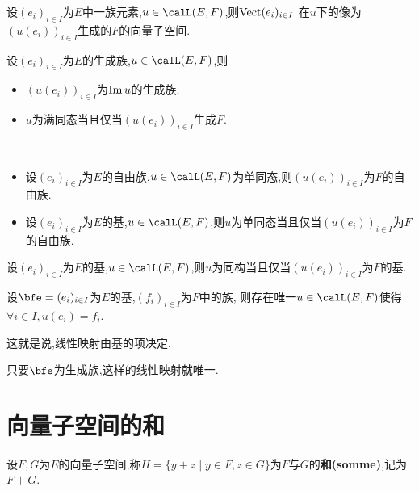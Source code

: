 \begin{prop}
    设$(e_i)_{i \in I}$为$E$中一族元素,$u \in \calL(E, F)$,则$\operatorname{Vect}(e_i)_{i \in I}$
    在$u$下的像为$(u(e_i))_{i \in I}$生成的$F$的向量子空间.
\end{prop}

\begin{cor}
    设$(e_i)_{i \in I}$为$E$的生成族,$u \in \calL(E, F)$,则
    \begin{itemize}
        \item $(u(e_i))_{i \in I}$为$\operatorname{Im} u$的生成族.
        \item $u$为满同态当且仅当$(u(e_i))_{i \in I}$生成$F$.
    \end{itemize}
\end{cor}

\begin{prop} $\ $
    \begin{itemize}
        \item 设$(e_i)_{i \in I}$为$E$的自由族,$u \in \calL(E, F)$为单同态,则$(u(e_i))_{i \in I}$为$F$的自由族.
        \item 设$(e_i)_{i \in I}$为$E$的基,$u \in \calL(E, F)$,则$u$为单同态当且仅当$(u(e_i))_{i \in I}$为$F$的自由族.
    \end{itemize}
\end{prop}

\begin{cor}
    设$(e_i)_{i \in I}$为$E$的基,$u \in \calL(E, F)$,则$u$为同构当且仅当$(u(e_i))_{i \in I}$为$F$的基.
\end{cor}

\begin{thm}
    设$\bfe = (e_i)_{i \in I}$为$E$的基,$(f_i)_{i \in I}$为$F$中的族,
    则存在唯一$u \in \calL(E, F)$使得$\forall i \in I, u(e_i) = f_i$.
\end{thm}

\begin{rqq}
    这就是说,线性映射由基的项决定.
\end{rqq}

\begin{rqq}
    只要$\bfe$为生成族,这样的线性映射就唯一.
\end{rqq}

\section{向量子空间的和}

\begin{deff}
    设$F, G$为$E$的向量子空间,称$H = \{ y + z \mid y \in F, z \in G \}$为$F$与$G$的\textbf{和(somme)},记为$F + G$.
\end{deff}

